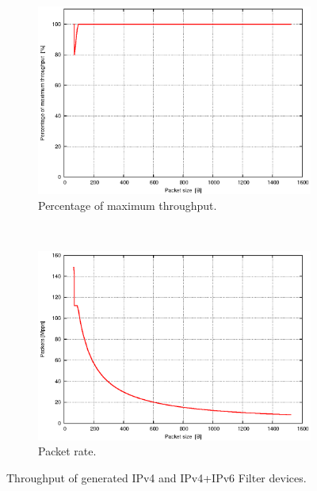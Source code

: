 \begin{figure}
    \centering
    \begin{subfigure}[b]{0.8\textwidth}
        \includegraphics[width=\textwidth]{chapters/pic/graphs/h2rc-cases/ipv46_throughput}
        \caption{Percentage of maximum throughput.}
        \label{fig:bitThroughputIpv46}
    \end{subfigure}
    ~
    \begin{subfigure}[b]{0.8\textwidth}
        \includegraphics[width=\textwidth]{chapters/pic/graphs/h2rc-cases/ipv46_mpps_throughput}
        \caption{Packet rate.}
        \label{fig:packetThroughputIpv46}
    \end{subfigure}
    
    \caption{Throughput of generated IPv4 and IPv4+IPv6 Filter devices.}
    \label{fig:Ipv46Throughput}
\end{figure}

